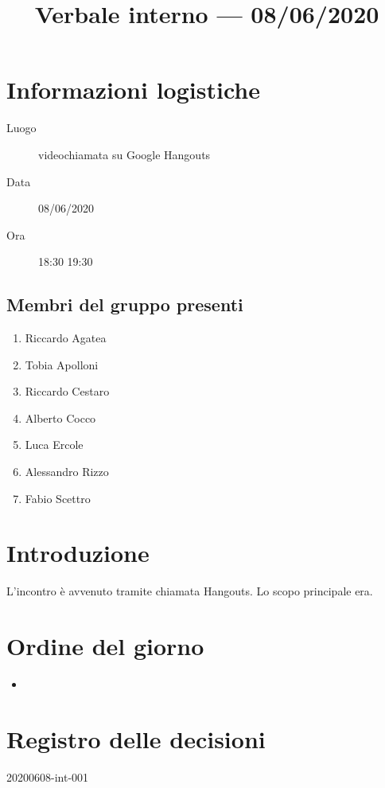 \documentclass{article}
\title{Verbale interno --- 08/06/2020}
\begin{document}


\section{Informazioni logistiche}%
\label{sec:informazioni_logistiche}

\begin{description}
  \item [Luogo] videochiamata su Google Hangouts
  \item [Data] 08/06/2020
  \item [Ora] 18:30  19:30
\end{description}

\subsection{Membri del gruppo presenti}%
\label{sub:membri_del_gruppo_presenti}

\begin{enumerate}
  \item Riccardo Agatea
  \item Tobia Apolloni
  \item Riccardo Cestaro
  \item Alberto Cocco
  \item Luca Ercole
  \item Alessandro Rizzo
  \item Fabio Scettro
\end{enumerate}

\section{Introduzione}%
\label{sec:introduzione}
L'incontro è avvenuto tramite chiamata Hangouts.
Lo scopo principale era.

\section{Ordine del giorno}%
\label{sec:ordine_del_giorno}

\begin{itemize}
  \item
\end{itemize}

\section{}%
\label{sec:}

\newpage
\section{Registro delle decisioni}%
\label{sec:registro_delle_decisioni}

\begin{description}
  \item[20200608-int-001]
\end{description}

\end{document}
